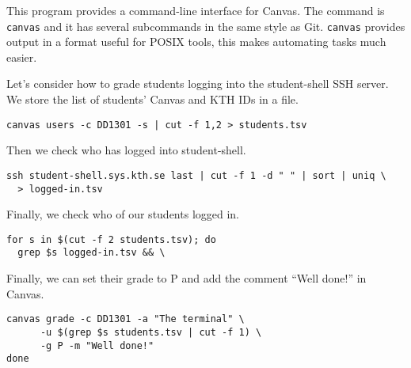 
This program provides a command-line interface for Canvas.
The command is \texttt{canvas} and it has several subcommands in the same style 
as Git.
\texttt{canvas} provides output in a format useful for POSIX tools, this makes 
automating tasks much easier.

Let's consider how to grade students logging into the student-shell SSH server.
We store the list of students' Canvas and KTH IDs in a file.
\begin{lstlisting}
canvas users -c DD1301 -s | cut -f 1,2 > students.tsv
\end{lstlisting}
Then we check who has logged into student-shell.
\begin{lstlisting}[firstnumber=2]
ssh student-shell.sys.kth.se last | cut -f 1 -d " " | sort | uniq \
  > logged-in.tsv
\end{lstlisting}
Finally, we check who of our students logged in.
\begin{lstlisting}[firstnumber=4]
for s in $(cut -f 2 students.tsv); do
  grep $s logged-in.tsv && \
\end{lstlisting}
Finally, we can set their grade to P and add the comment \enquote{Well done!} 
in Canvas.
\begin{lstlisting}[firstnumber=6]
    canvas grade -c DD1301 -a "The terminal" \
      -u $(grep $s students.tsv | cut -f 1) \
      -g P -m "Well done!"
done
\end{lstlisting}

